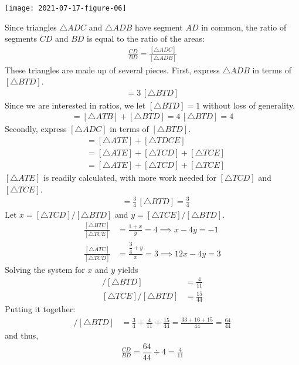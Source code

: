\documentclass[12pt]{article}
\begin{document}
\nopagebreak

\begin{center}
  \texttt{[image: 2021-07-17-figure-06]}
\end{center}

\nopagebreak


\begin{answer}
Since triangles $\triangle ADC$ and $\triangle ADB$ have segment $AD$ in common, the ratio of segments $CD$ and $BD$ is equal to the ratio of the areas:
\begin{align*}
\frac{CD}{BD}
 = \frac{[\triangle ADC]}{[\triangle ADB]}
\end{align*}
These triangles are made up of several pieces. First, express $\triangle ADB$  in terms of $[\triangle BTD]$.
\begin{align*}
[\triangle ATB] = 3 \, [\triangle BTD]
\end{align*}
Since we are interested in ratios, we let $[\triangle BTD] = 1$ without loss of generality. 
\begin{align*}
[\triangle ADB] = [\triangle ATB] + [\triangle BTD] = 4 \, [\triangle BTD] = 4
\end{align*}
Secondly, express $[\triangle ADC]$ in terms of $[\triangle BTD]$.
\begin{align*}
[\triangle ADC] 
  & = [\triangle ATE] + [\triangle TDCE] \\
  & = [\triangle ATE] + [\triangle TCD] + [\triangle TCE] \\
  & = [\triangle ATE] + [\triangle TCD] + [\triangle TCE]
\end{align*}
$[\triangle ATE]$ is readily calculated, with more work needed for $[\triangle TCD]$ and $[\triangle TCE]$.
\begin{align*}
[\triangle ATE] & = \frac{3}{4} \, [\triangle BTD] = \frac{3}{4}
\end{align*}
Let $x = [\triangle TCD]/[\triangle BTD]$ and $y = [\triangle TCE]/[\triangle BTD]$. 
\begin{align*}
\frac{[\triangle BTC]}{[\triangle TCE]} 
 & = \frac{1+x}{y}  = 4 
\implies 
 x - 4y = -1 \\
\frac{[\triangle ATC]}{[\triangle TCD]} 
 & = \frac{\dfrac{3}{4}+y}{x} = 3
\implies 
 12x - 4y = 3
\end{align*}
Solving the system for $x$ and $y$ yields
\begin{align*}
[\triangle TCD] / [\triangle BTD] & = \frac{4}{11} \\[1ex]
[\triangle TCE] / [\triangle BTD] & = \frac{15}{44}
\end{align*}
Putting it together:
\begin{align*}
[\triangle ADC] / [\triangle BTD] 
  & = \frac{3}{4} + \frac{4}{11} + \frac{15}{44}
    = \frac{33+16+15}{44}
    = \frac{64}{44}
\end{align*}
and thus,
\begin{align*}
\frac{CD}{BD} 
  = \dfrac{64}{44} \div 4
  = \frac{4}{11}
\end{align*}


\end{answer}
\end{document}
